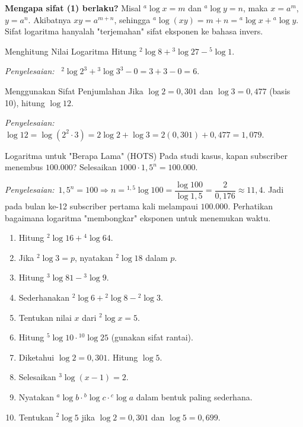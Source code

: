 \documentclass[11pt,a4paper]{report}
\theoremstyle{gaya}
\newcommand{\jawab}{\par\smallskip\noindent\textit{\textcolor{oranye}{Penyelesaian:}}\ }
\begin{document}
\textbf{Mengapa sifat (1) berlaku?} Misal ${}^{a}\!\log x=m$ dan ${}^{a}\!\log y=n$, maka $x=a^m$, $y=a^n$. Akibatnya $xy=a^{m+n}$, sehingga ${}^{a}\!\log(xy)=m+n={}^{a}\!\log x+{}^{a}\!\log y$. Sifat logaritma hanyalah "terjemahan" sifat eksponen ke bahasa invers.

\begin{contoh}{Menghitung Nilai Logaritma}
Hitung ${}^{2}\!\log 8 + {}^{3}\!\log 27 - {}^{5}\!\log 1$.

\jawab
${}^{2}\!\log 2^3 + {}^{3}\!\log 3^3 - 0 = 3 + 3 - 0 = 6.$
\end{contoh}

\begin{contoh}{Menggunakan Sifat Penjumlahan}
Jika $\log 2 = 0{,}301$ dan $\log 3 = 0{,}477$ (basis 10), hitung $\log 12$.

\jawab $\log 12 = \log(2^2\cdot 3)=2\log 2+\log 3 = 2(0{,}301)+0{,}477 = 1{,}079.$
\end{contoh}

\begin{contoh}{Logaritma untuk "Berapa Lama" (HOTS)}
Pada studi kasus, kapan subscriber menembus $100.000$? Selesaikan $1000\cdot 1{,}5^{n}=100.000$.

\jawab $1{,}5^n=100 \Rightarrow n = {}^{1{,}5}\!\log 100 = \dfrac{\log 100}{\log 1{,}5}=\dfrac{2}{0{,}176}\approx 11{,}4$. Jadi pada bulan ke-12 subscriber pertama kali melampaui $100.000$. Perhatikan bagaimana logaritma "membongkar" eksponen untuk menemukan waktu.
\end{contoh}

\begin{latihan}
\begin{enumerate}[leftmargin=*]
  \item Hitung ${}^{2}\!\log 16 + {}^{4}\!\log 64$.
  \item Jika ${}^{2}\!\log 3 = p$, nyatakan ${}^{2}\!\log 18$ dalam $p$.
  \item Hitung ${}^{3}\!\log 81 - {}^{3}\!\log 9$.
  \item Sederhanakan ${}^{2}\!\log 6 + {}^{2}\!\log 8 - {}^{2}\!\log 3$.
  \item Tentukan nilai $x$ dari ${}^{2}\!\log x = 5$.
  \item Hitung ${}^{5}\!\log 10 \cdot {}^{10}\!\log 25$ (gunakan sifat rantai).
  \item Diketahui $\log 2 = 0{,}301$. Hitung $\log 5$.
  \item Selesaikan ${}^{3}\!\log(x-1)=2$.
  \item Nyatakan ${}^{a}\!\log b \cdot {}^{b}\!\log c \cdot {}^{c}\!\log a$ dalam bentuk paling sederhana.
  \item Tentukan ${}^{2}\!\log 5$ jika $\log 2=0{,}301$ dan $\log 5 = 0{,}699$.
\end{enumerate}
\end{latihan}
\end{document}
